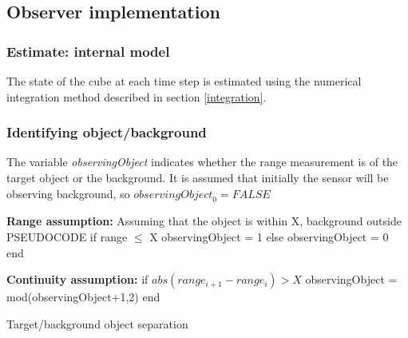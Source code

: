	
\subsection{Observer implementation}
	\subsubsection{Estimate: internal model}
		The state of the cube at each time step is estimated using the numerical integration method described in section \ref{integration}.
	
	\subsubsection{Identifying object/background}
		The variable \textit{observingObject} indicates whether the range measurement is of the target object or the background. It is assumed that initially the sensor will be observing background, so $\textit{observingObject}_0 = FALSE$

		\textbf{Range assumption:}
		Assuming that the object is within X, background outside
		PSEUDOCODE
		if range $\leq$ X
			observingObject = 1
		else
			observingObject = 0
		end
		
		\textbf{Continuity assumption:}
		if $abs(range_{i+1}-range_i) > X$
			observingObject = mod(observingObject+1,2)
		end
		
		\IncMargin{2em}
		\begin{algorithm}
		\DontPrintSemicolon
	
		\caption{Target/background object separation}
		\end{algorithm}
		
